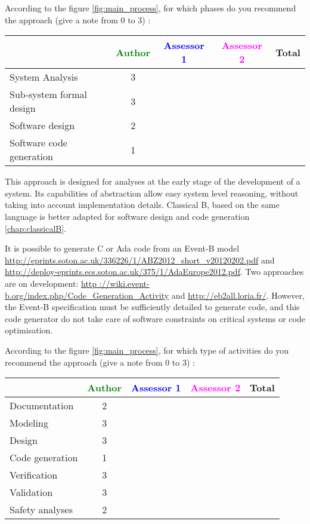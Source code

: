 According to the figure \ref{fig:main_process}, for which phases do you recommend the approach (give a note from 0 to  3) :

\begin{tabular}{|l | c | c | c | c|}
\hline
& \textcolor{green}{Author} & \textcolor{blue}{Assessor 1} & \textcolor{magenta}{Assessor 2} & Total \\
\hline 
System Analysis & 3 & & &  \\
\hline
Sub-system formal design & 3 & & & \\
\hline
Software design & 2 & & & \\
\hline
Software code generation & 1 & & & \\
\hline
\end{tabular}

\begin{author_comment}
This approach is designed for analyses at the early stage of the development of a system. Its capabilities of abstraction allow easy system level reasoning, without taking into account implementation details. Classical B, based on the same language is better adapted for software design and code generation \ref{chap:classicalB}.

It is possible to generate C or Ada code from an Event-B model \url{http://eprints.soton.ac.uk/336226/1/ABZ2012_short_v20120202.pdf} and \url{http://deploy-eprints.ecs.soton.ac.uk/375/1/AdaEurope2012.pdf}. Two  approaches are on development: \url{http ://wiki.event-b.org/index.php/Code_Generation_Activity} and \url{http://eb2all.loria.fr/}. However, the Event-B specification must be sufficiently detailed to generate code, and this code generator do not take care of software constraints on critical systems or code optimisation.
\end{author_comment}


According to the figure \ref{fig:main_process}, for which type of activities do you recommend the approach (give a note from 0 to  3) :

\begin{tabular}{|l | c | c | c | c|}
\hline
& \textcolor{green}{Author} & \textcolor{blue}{Assessor 1} & \textcolor{magenta}{Assessor 2} & Total \\
\hline 
Documentation & 2 & & &  \\
\hline
Modeling & 3 & & &  \\
\hline
Design & 3 & & & \\
\hline
Code generation & 1 & & & \\
\hline
Verification & 3 & & & \\
\hline
Validation & 3 & & & \\
\hline
Safety analyses & 2 & & & \\
\hline
\end{tabular}

